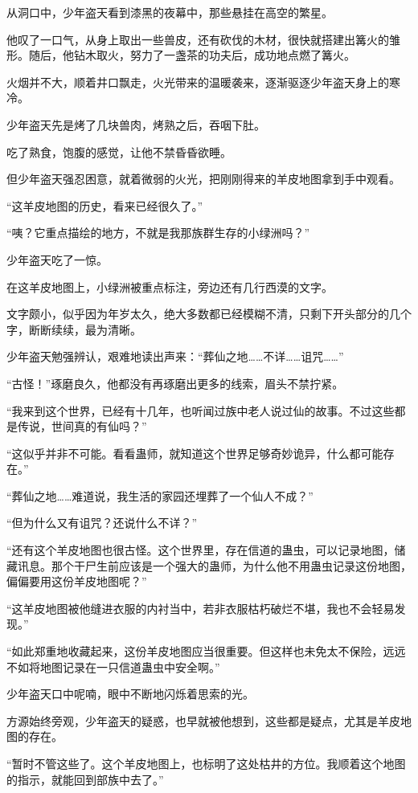 \begin{this_body}
从洞口中，少年盗天看到漆黑的夜幕中，那些悬挂在高空的繁星。

他叹了一口气，从身上取出一些兽皮，还有砍伐的木材，很快就搭建出篝火的雏形。随后，他钻木取火，努力了一盏茶的功夫后，成功地点燃了篝火。

火烟并不大，顺着井口飘走，火光带来的温暖袭来，逐渐驱逐少年盗天身上的寒冷。

少年盗天先是烤了几块兽肉，烤熟之后，吞咽下肚。

吃了熟食，饱腹的感觉，让他不禁昏昏欲睡。

但少年盗天强忍困意，就着微弱的火光，把刚刚得来的羊皮地图拿到手中观看。

“这羊皮地图的历史，看来已经很久了。”

“咦？它重点描绘的地方，不就是我那族群生存的小绿洲吗？”

少年盗天吃了一惊。

在这羊皮地图上，小绿洲被重点标注，旁边还有几行西漠的文字。

文字颇小，似乎因为年岁太久，绝大多数都已经模糊不清，只剩下开头部分的几个字，断断续续，最为清晰。

少年盗天勉强辨认，艰难地读出声来：“葬仙之地……不详……诅咒……”

“古怪！”琢磨良久，他都没有再琢磨出更多的线索，眉头不禁拧紧。

“我来到这个世界，已经有十几年，也听闻过族中老人说过仙的故事。不过这些都是传说，世间真的有仙吗？”

“这似乎并非不可能。看看蛊师，就知道这个世界足够奇妙诡异，什么都可能存在。”

“葬仙之地……难道说，我生活的家园还埋葬了一个仙人不成？”

“但为什么又有诅咒？还说什么不详？”

“还有这个羊皮地图也很古怪。这个世界里，存在信道的蛊虫，可以记录地图，储藏讯息。那个干尸生前应该是一个强大的蛊师，为什么他不用蛊虫记录这份地图，偏偏要用这份羊皮地图呢？”

“这羊皮地图被他缝进衣服的内衬当中，若非衣服枯朽破烂不堪，我也不会轻易发现。”

“如此郑重地收藏起来，这份羊皮地图应当很重要。但这样也未免太不保险，远远不如将地图记录在一只信道蛊虫中安全啊。”

少年盗天口中呢喃，眼中不断地闪烁着思索的光。

方源始终旁观，少年盗天的疑惑，也早就被他想到，这些都是疑点，尤其是羊皮地图的存在。

“暂时不管这些了。这个羊皮地图上，也标明了这处枯井的方位。我顺着这个地图的指示，就能回到部族中去了。”


\end{this_body}
